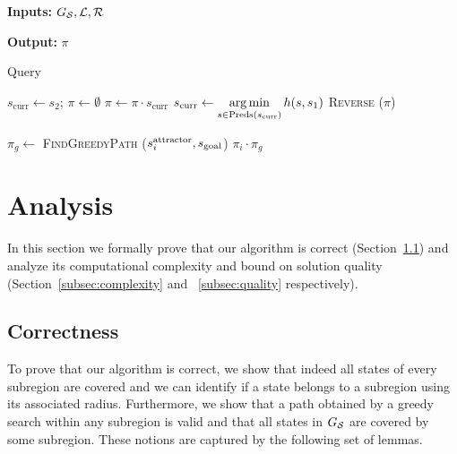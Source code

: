 \documentclass[a4paper]{report}
\begin{document}
\begin{algorithm}[t]
\hspace*{\algorithmicindent} \textbf{Inputs:} $G_\mathcal{S}, \mathcal{L}, \mathcal{R}$

\hspace*{\algorithmicindent} \textbf{Output:} $\pi$	
\caption{Query}\label{alg:3}

\begin{algorithmic}[1]
  \label{alg:3:greedy-call-start}
  \State $s_{\text{curr}} \leftarrow s_2$; \hspace{2mm} $\pi \leftarrow \emptyset$
   \label{alg:3:while}
    \State $\pi \leftarrow \pi \cdot s_{\text{curr}}$
      \State $s_{\text{curr}} \leftarrow \operatorname*{arg\,min}\limits_{s \in \text{Preds}(s_{\text{curr}})} h(s, s_1)$  
    \EndWhile
    \State \Return \textsc{Reverse} ($\pi$)   
\EndProcedure
\label{alg:3:greedy-call-end}

\vspace{2mm}

    \label{alg:3:covers}
      \State $\pi_g \leftarrow$ \textsc{FindGreedyPath} ($s^{\text{attractor}}_i, s_{\text{goal}}$)
      \label{alg:3:greedy-call}
      \State \Return $\pi_i \cdot \pi_g$  
      \label{alg:3:return}
    \EndIf
  \EndFor

\EndProcedure
\end{algorithmic}
\end{algorithm}


\section{Analysis}
\label{sec:analysis1}
In this section we formally prove that 
our algorithm is correct (Section~\ref{subsec:correct}) and 
analyze its computational complexity and bound on solution quality (Section~\ref{subsec:complexity} and ~\ref{subsec:quality} respectively).

\subsection{Correctness}
\label{subsec:correct}
To prove that our algorithm is correct, we show that indeed all states of every subregion are covered and we can identify if a state belongs to a subregion using its associated radius.
Furthermore, we show that a path obtained by a greedy search within any subregion is valid and that all states in $G_\mathcal{S}$ are covered by some subregion.
These notions are captured by the following set of lemmas.
\end{document}
